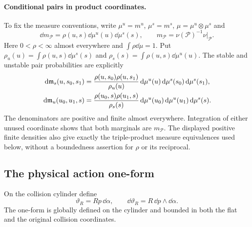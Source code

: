 \paragraph{Conditional pairs in product coordinates.}
To fix the measure conventions, write $\mu^u=m^u$, $\mu^s=m^s$,
$\mu=\mu^u\otimes\mu^s$ and
\[
 \dd m_{\mathcal P}=\rho(u,s)\dd\mu^u(u)\dd\mu^s(s),\qquad
 m_{\mathcal P}=\nu(\mathcal P)^{-1}\nu|_{\mathcal P}.
\]
Here $0<\rho<\infty$ almost everywhere and $\int\rho\dd\mu=1$.
Put $\rho_u(u)=\int\rho(u,s)\dd\mu^s(s)$ and
$\rho_s(s)=\int\rho(u,s)\dd\mu^u(u)$. The stable and unstable pair
probabilities are explicitly
\begin{align}\label{eq:explicit-conditional-pair-densities}
 \,\mathrm d\mathfrak m_s(u,s_0,s_1)
 &=\frac{\rho(u,s_0)\rho(u,s_1)}{\rho_u(u)}
           \,\mathrm d\mu^u(u)\,\mathrm d\mu^s(s_0)\,\mathrm d\mu^s(s_1),\\
 \,\mathrm d\mathfrak m_u(u_0,u_1,s)
 &=\frac{\rho(u_0,s)\rho(u_1,s)}{\rho_s(s)}
           \,\mathrm d\mu^u(u_0)\,\mathrm d\mu^u(u_1)\,\mathrm d\mu^s(s).\notag
\end{align}
The denominators are positive and finite almost everywhere. Integration
of either unused coordinate shows that both marginals are
$m_{\mathcal P}$. The displayed positive finite densities also give
exactly the triple-product measure equivalences used below, without
a boundedness assertion for $\rho$ or its reciprocal.

\subsection{The physical action one-form}
On the collision cylinder define
\begin{equation}\label{eq:collision-action-form}
 \vartheta_R=Rp\,\dd\alpha,\qquad
 \dd\vartheta_R=R\,\dd p\wedge\dd\alpha.
\end{equation}
The one-form is globally defined on the cylinder and bounded in both
the flat and the original collision coordinates.

